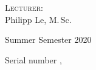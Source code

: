 \begin{titlepage}
\begin{center}
		\vspace{0.75cm}

		\normalsize
		\textsc{Lecturer:} \\
		Philipp Le, M.\,Sc.
		
		\vspace{0.75cm}
		
		\normalsize
		Summer Semester 2020
	\end{center}

	\vfill
	
	\begin{flushright}
		\footnotesize
		Serial number \VcsCommitNo, \VcsCommitDate
	\end{flushright}
\end{titlepage}
